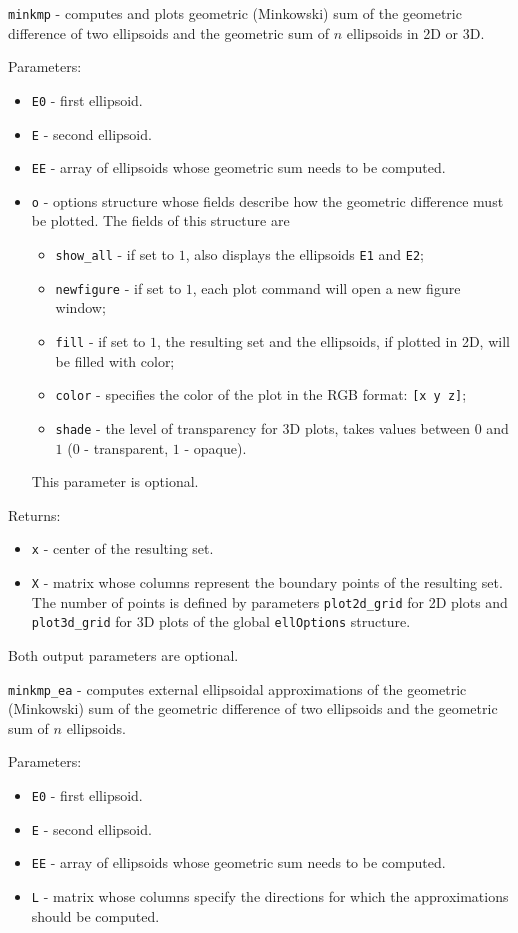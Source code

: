 \newpage

{\Large {\tt minkmp}} - computes and plots geometric (Minkowski) sum of the
geometric difference of two ellipsoids and the geometric sum of $n$ ellipsoids
in 2D or 3D.

Parameters:
\begin{itemize}
\item {\tt E0} - first ellipsoid.
\item {\tt E} - second ellipsoid.
\item {\tt EE} - array of ellipsoids whose geometric sum needs to be computed.
\item {\tt o} - options structure whose fields describe how the geometric
difference must be plotted. The fields of this structure are
\begin{itemize}
\item {\tt show\_all} - if set to $1$, also displays the ellipsoids
{\tt E1} and {\tt E2};
\item {\tt newfigure} - if set to $1$, each plot command will open a new
figure window;
\item {\tt fill} - if set to $1$, the resulting set and the ellipsoids,
if plotted in 2D, will be filled with color;
\item {\tt color} - specifies the color of the plot in the RGB format:
{\tt [x y z]};
\item {\tt shade} - the level of transparency for 3D plots, takes values
between $0$ and $1$ ($0$ - transparent, $1$ - opaque).
\end{itemize}
This parameter is optional.
\end{itemize}

Returns:
\begin{itemize}
\item {\tt x} - center of the resulting set.
\item {\tt X} - matrix whose columns represent the boundary points of the
resulting set. The number of points is defined by parameters
{\tt plot2d\_grid} for 2D plots and {\tt plot3d\_grid} for 3D plots of the
global {\tt ellOptions} structure.
\end{itemize}
Both output parameters are optional.

\newpage

{\Large {\tt minkmp\_ea}} - computes external ellipsoidal approximations
of the geometric (Minkowski) sum of the geometric difference of two ellipsoids
and the geometric sum of $n$ ellipsoids.

Parameters:
\begin{itemize}
\item {\tt E0} - first ellipsoid.
\item {\tt E} - second ellipsoid.
\item {\tt EE} - array of ellipsoids whose geometric sum needs to be computed.
\item {\tt L} - matrix whose columns specify the directions for which
the approximations should be computed.
\end{itemize}

